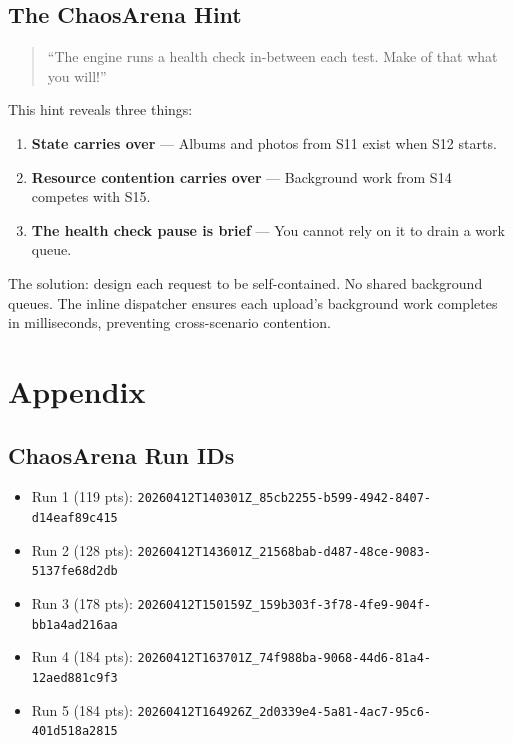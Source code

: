 \documentclass[11pt]{article}
\begin{document}
\subsection{The ChaosArena Hint}

\begin{quote}
``The engine runs a health check in-between each test. Make of that what you will!''
\end{quote}

This hint reveals three things:
\begin{enumerate}
    \item \textbf{State carries over} --- Albums and photos from S11 exist when S12 starts.
    \item \textbf{Resource contention carries over} --- Background work from S14 competes with S15.
    \item \textbf{The health check pause is brief} --- You cannot rely on it to drain a work queue.
\end{enumerate}

The solution: design each request to be self-contained. No shared background queues. The inline dispatcher ensures each upload's background work completes in milliseconds, preventing cross-scenario contention.

\section{Appendix}

\subsection{ChaosArena Run IDs}

\begin{itemize}
    \item Run 1 (119 pts): \texttt{20260412T140301Z\_85cb2255-b599-4942-8407-d14eaf89c415}
    \item Run 2 (128 pts): \texttt{20260412T143601Z\_21568bab-d487-48ce-9083-5137fe68d2db}
    \item Run 3 (178 pts): \texttt{20260412T150159Z\_159b303f-3f78-4fe9-904f-bb1a4ad216aa}
    \item Run 4 (184 pts): \texttt{20260412T163701Z\_74f988ba-9068-44d6-81a4-12aed881c9f3}
    \item Run 5 (184 pts): \texttt{20260412T164926Z\_2d0339e4-5a81-4ac7-95c6-401d518a2815}
\end{itemize}
\end{document}
